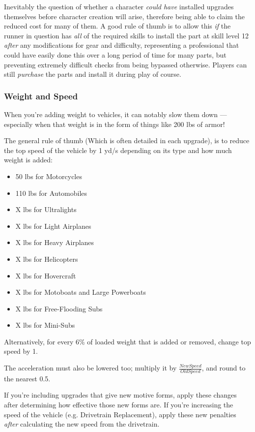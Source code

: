 \begin{multicols*}{2}
	Inevitably the question of whether a character \textit{could have} installed upgrades themselves before character creation will arise, therefore being able to claim the reduced cost for many of them. A good rule of thumb is to allow this \textit{if} the runner in question has \textit{all} of the required skills to install the part at skill level 12 \textit{after} any modifications for gear and difficulty, representing a professional that could have easily done this over a long period of time for many parts, but preventing extremely difficult checks from being bypassed otherwise. Players can still \textit{purchase} the parts and install it during play of course.
			
	\subsubsection{Weight and Speed}\label{weight_and_speed}
	
	When you're adding weight to vehicles, it can notably slow them down — especially when that weight is in the form of things like 200 lbs of armor! 
	
	The general rule of thumb (Which is often detailed in each upgrade), is to reduce the top speed of the vehicle by 1 yd/s depending on its type and how much weight is added:
	
	\begin{itemize}
		\itemsep 0pt
		\item 50 lbs for Motorcycles
		\item 110 lbs for Automobiles
		\item X lbs for Ultralights
		\item X lbs for Light Airplanes
		\item X lbs for Heavy Airplanes
		\item X lbs for Helicopters
		\item X lbs for Hovercraft
		\item X lbs for Motoboats and Large Powerboats
		\item X lbs for Free-Flooding Subs
		\item X lbs for Mini-Subs
	\end{itemize}

	Alternatively, for every 6\% of loaded weight that is added or removed, change top speed by 1.
	
	The acceleration must also be lowered too; multiply it by $\frac{New Speed}{Old Speed}$, and round to the nearest 0.5. 
	
	If you're including upgrades that give new motive forms, apply these changes after determining how effective those new forms are. If you're increasing the speed of the vehicle (e.g. Drivetrain Replacement), apply these new penalties \textit{after} calculating the new speed from the drivetrain.
	

\end{multicols*}
